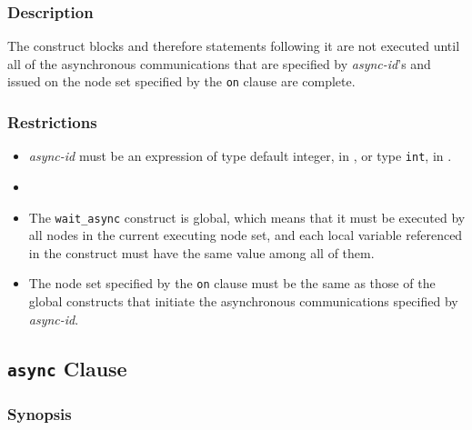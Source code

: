 \subsubsection*{Description}

The {\tt {}} construct blocks and therefore
statements following it are not executed until all of the asynchronous
communications that are specified by {\it async-id}'s and issued on the
node set specified by the {\tt on} clause are complete.

\subsubsection*{Restrictions}

\begin{itemize}
 \item {\it async-id} must be an expression of type default integer, in
       {\XMPF}, or type {\tt int}, in {\XMPC}.
 \item {}
 \item The {\tt wait\_async} construct is global, which means that it must
       be executed by all nodes in the current executing node set, and
       each local variable referenced in the construct must have the
       same value among all of them.
 \item The node set specified by the {\tt on} clause must be the same as
       those of the global constructs that initiate the asynchronous
       communications specified by {\it async-id}.
\end{itemize}


\subsection{{\tt async} Clause}

\subsubsection*{Synopsis}

